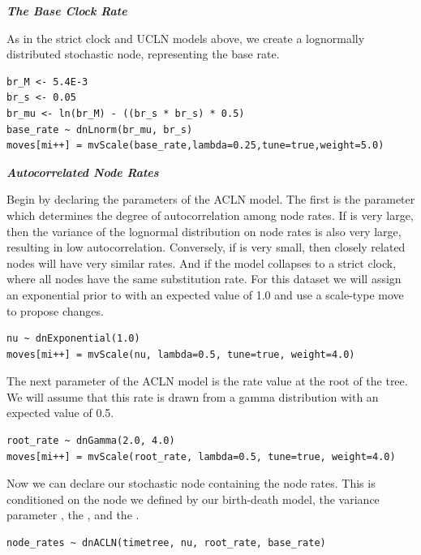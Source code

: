 \textbf{\textit{The Base Clock Rate}}

As in the strict clock and UCLN models above, we create a lognormally distributed stochastic node, representing the base rate.
{\tt \begin{snugshade*}
\begin{lstlisting}
br_M <- 5.4E-3
br_s <- 0.05
br_mu <- ln(br_M) - ((br_s * br_s) * 0.5)
base_rate ~ dnLnorm(br_mu, br_s)
moves[mi++] = mvScale(base_rate,lambda=0.25,tune=true,weight=5.0)
\end{lstlisting}
\end{snugshade*}}


\textbf{\textit{Autocorrelated Node Rates}}

Begin by declaring the parameters of the ACLN model. The first is the parameter  which determines the degree of autocorrelation among node rates. If  is very large, then the variance of the lognormal distribution on node rates is also very large, resulting in low autocorrelation. 
Conversely, if  is very small, then closely related nodes will have very similar rates.
And if  the model collapses to a strict clock, where all nodes have the same substitution rate.
For this dataset we will assign an exponential prior to  with an expected value of 1.0 and use a scale-type move to propose changes.
{\tt \begin{snugshade*}
\begin{lstlisting}
nu ~ dnExponential(1.0)
moves[mi++] = mvScale(nu, lambda=0.5, tune=true, weight=4.0)
\end{lstlisting}
\end{snugshade*}}

The next parameter of the ACLN model is the rate value at the root of the tree. 
We will assume that this rate is drawn from a gamma distribution with an expected value of 0.5.
{\tt \begin{snugshade*}
\begin{lstlisting}
root_rate ~ dnGamma(2.0, 4.0)
moves[mi++] = mvScale(root_rate, lambda=0.5, tune=true, weight=4.0)
\end{lstlisting}
\end{snugshade*}}

Now we can declare our stochastic node containing the node rates. 
This is conditioned on the  node we defined by our birth-death model, the variance parameter , the , and the .
{\tt \begin{snugshade*}
\begin{lstlisting}
node_rates ~ dnACLN(timetree, nu, root_rate, base_rate)
\end{lstlisting}
\end{snugshade*}}

